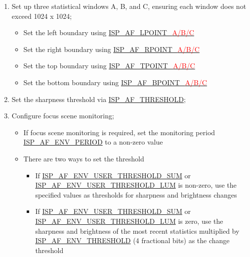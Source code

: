 \documentclass[main\_\_EN.tex]{subfiles}
\begin{document}
\begin{enumerate}
    \item Set up three statistical windows A, B, and C, ensuring each window does not exceed 1024 x 1024;
    \begin{itemize}
        \item Set the left boundary using \hyperref[fielddesc:ISPAFLPOINTA]{ISP\_AF\_LPOINT\_\textcolor{red}{A/B/C}}
        \item Set the right boundary using \hyperref[fielddesc:ISPAFRPOINTA]{ISP\_AF\_RPOINT\_\textcolor{red}{A/B/C}}
        \item Set the top boundary using \hyperref[fielddesc:ISPAFTPOINTA]{ISP\_AF\_TPOINT\_\textcolor{red}{A/B/C}}
        \item Set the bottom boundary using \hyperref[fielddesc:ISPAFBPOINTA]{ISP\_AF\_BPOINT\_\textcolor{red}{A/B/C}}
    \end{itemize}

    \item Set the sharpness threshold via \hyperref[fielddesc:ISPAFTHRESHOLD]{ISP\_AF\_THRESHOLD};

    \item Configure focus scene monitoring;
    \begin{itemize}
        \item If focus scene monitoring is required, set the monitoring period \hyperref[fielddesc:ISPAFENVPERIOD]{ISP\_AF\_ENV\_PERIOD} to a non-zero value
        \item There are two ways to set the threshold
        \begin{itemize}
            \item If \hyperref[fielddesc:ISPAFENVUSERTHRESHOLDSUM]{ISP\_AF\_ENV\_USER\_THRESHOLD\_SUM} or \hyperref[fielddesc:ISPAFENVUSERTHRESHOLDLUM]{ISP\_AF\_ENV\_USER\_THRESHOLD\_LUM} is non-zero, use the specified values as thresholds for sharpness and brightness changes
            \item If \hyperref[fielddesc:ISPAFENVUSERTHRESHOLDSUM]{ISP\_AF\_ENV\_USER\_THRESHOLD\_SUM} or \hyperref[fielddesc:ISPAFENVUSERTHRESHOLDLUM]{ISP\_AF\_ENV\_USER\_THRESHOLD\_LUM} is zero, use the sharpness and brightness of the most recent statistics multiplied by \hyperref[fielddesc:ISPAFENVTHRESHOLD]{ISP\_AF\_ENV\_THRESHOLD} (4 fractional bits) as the change threshold
        \end{itemize}
    \end{itemize}


\end{enumerate}
\end{document}
